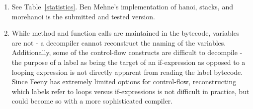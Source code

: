 \documentclass[notitlepage]{report}
\begin{document}
\begin{enumerate}
	\item
			See Table~\ref{statistics}.  Ben Mehne's implementation of hanoi, stacks, and morehanoi is the submitted and tested version.
	\item
		While method and function calls are maintained in the bytecode, variables are not - a decompiler cannot reconstruct the naming of the variables.    Additionally, some of the control-flow constructs are difficult to decompile - the purpose of a label as being the target of an if-expression as opposed to a looping expression is not directly apparent from reading the label bytecode.  Since Feeny has extremely limited options for control-flow, reconstructing which labels refer to loops versus if-expressions is not difficult in practice, but could become so with a more sophisticated compiler.


\end{enumerate}
\end{document}
